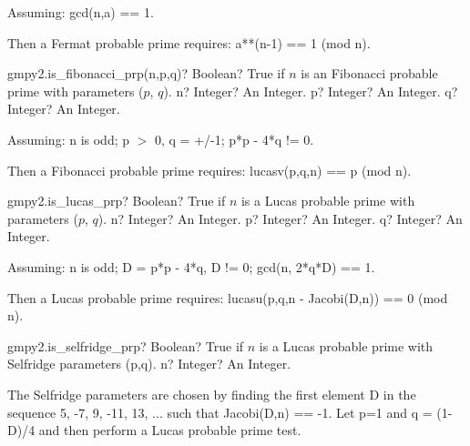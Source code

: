 \vspace{0.3cm}

Assuming: gcd(n,a) == 1.

Then a Fermat probable prime requires: a**(n-1) == 1 (mod n).






\vspace{0.6cm}
\begin{mpFunctionsExtract}
	\mpFunctionThree
	{gmpy2.is\_fibonacci\_prp(n,p,q)? Boolean? True if $n$ is an Fibonacci probable prime with parameters ($p$, $q$).}
	{n? Integer? An Integer.}
	{p? Integer? An Integer.}
	{q? Integer? An Integer.}
\end{mpFunctionsExtract}

\vspace{0.3cm}
Assuming: n is odd; p $>$ 0, q = +/-1; p*p - 4*q != 0.

Then a Fibonacci probable prime requires: lucasv(p,q,n) == p (mod n).





\vspace{0.6cm}
\begin{mpFunctionsExtract}
	\mpFunctionThree
	{gmpy2.is\_lucas\_prp? Boolean? True if $n$ is a Lucas probable prime with parameters ($p$, $q$).}
	{n? Integer? An Integer.}
	{p? Integer? An Integer.}
	{q? Integer? An Integer.}
\end{mpFunctionsExtract}

\vspace{0.3cm}
Assuming: n is odd; D = p*p - 4*q, D != 0; gcd(n, 2*q*D) == 1.

Then a Lucas probable prime requires: lucasu(p,q,n - Jacobi(D,n)) == 0 (mod n).



\vspace{0.6cm}

\begin{mpFunctionsExtract}
	\mpFunctionOne
	{gmpy2.is\_selfridge\_prp? Boolean? True if $n$ is a Lucas probable prime with Selfridge parameters (p,q).}
	{n? Integer? An Integer.}
\end{mpFunctionsExtract}

\vspace{0.3cm}
The Selfridge parameters are chosen by finding the first element D in the sequence {5, -7, 9, -11, 13, ...} such that Jacobi(D,n) == -1. Let p=1 and q = (1-D)/4 and then perform a Lucas probable prime test.



